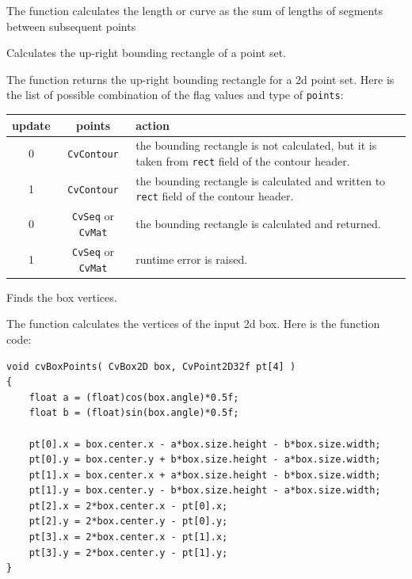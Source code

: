 The function calculates the length or curve as the sum of lengths of segments between subsequent points

Calculates the up-right bounding rectangle of a point set.


\begin{description}
\end{description}

The function returns the up-right bounding rectangle for a 2d point set.
Here is the list of possible combination of the flag values and type of \texttt{points}:

\begin{tabular}{|c|c|p{3in}|}
\hline
update & points & action \\ \hline
0 & \texttt{CvContour\*} & the bounding rectangle is not calculated, but it is taken from \texttt{rect} field of the contour header.\\ \hline
1 & \texttt{CvContour\*} & the bounding rectangle is calculated and written to \texttt{rect} field of the contour header.\\ \hline
0 & \texttt{CvSeq\*} or \texttt{CvMat\*} & the bounding rectangle is calculated and returned.\\ \hline
1 & \texttt{CvSeq\*} or \texttt{CvMat\*} & runtime error is raised.\\ \hline
\end{tabular}

Finds the box vertices.


\begin{description}
\end{description}

The function calculates the vertices of the input 2d box. Here is the function code:

\begin{lstlisting}
void cvBoxPoints( CvBox2D box, CvPoint2D32f pt[4] )
{
    float a = (float)cos(box.angle)*0.5f;
    float b = (float)sin(box.angle)*0.5f;

    pt[0].x = box.center.x - a*box.size.height - b*box.size.width;
    pt[0].y = box.center.y + b*box.size.height - a*box.size.width;
    pt[1].x = box.center.x + a*box.size.height - b*box.size.width;
    pt[1].y = box.center.y - b*box.size.height - a*box.size.width;
    pt[2].x = 2*box.center.x - pt[0].x;
    pt[2].y = 2*box.center.y - pt[0].y;
    pt[3].x = 2*box.center.x - pt[1].x;
    pt[3].y = 2*box.center.y - pt[1].y;
}
\end{lstlisting}

